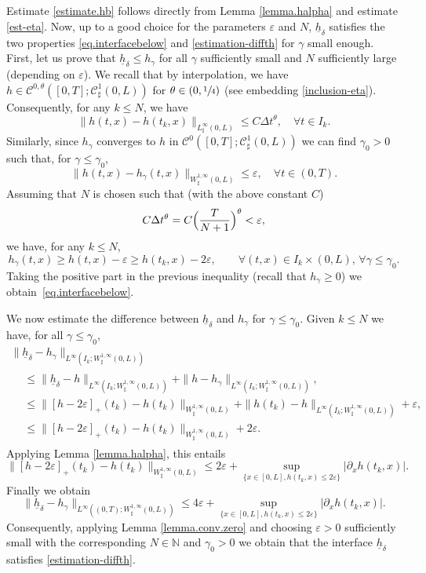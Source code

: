 \documentclass[10pt]{amsart}
\let\mathcal\mathscr
\theoremstyle{remark}
\theoremstyle{definition}
\newcommand{\Natural}{\mathbb{N}}
\newcommand{\hb}{{\underline{h}}}
\begin{document}
Estimate \eqref{estimate.hb} follows directly from Lemma \ref{lemma.halpha} and estimate \eqref{est-eta}.
Now, up to a good choice for the parameters $\varepsilon$ and $N$, $\hb_{\delta}$ satisfies the two
properties \eqref{eq.interfacebelow} and \eqref{estimation-diffth} for $\gamma$ small enough. First, let us prove that $\hb_{\delta}\leq h_{\gamma}$ for all $\gamma$ sufficiently small and $N$ sufficiently large (depending on $\varepsilon$). We recall that by interpolation, we have $h \in \mathcal{C}^{0,\theta}([0,T];\mathcal{C}^{1}_{\sharp}(0,L))$ for $\theta\in(0,\sfrac{1}{4})$ (see embedding \eqref{inclusion-eta}). Consequently, for any $k \leq N$, we have
\[
\|h(t,x) - h(t_{k},x)\|_{L^{\infty}_{\sharp}(0,L)} \leq C \Delta t^{\theta}, \quad \forall t \in I_k.
\]
Similarly, since $h_{\gamma}$ converges to $h$ in $\mathcal{C}^{0}([0,T];\mathcal{C}_\sharp^{1}(0,L))$ we can find $\gamma_0 >0$ such that, for $\gamma \leq \gamma_0$,
\[
\|h(t,x) - h_{\gamma}(t,x)\|_{W^{1,\infty}_{\sharp}(0,L)} \leq \varepsilon, \quad \forall t \in (0,T).
\]
Assuming that $N$ is chosen such that (with the above constant $C$)
\[
C \Delta t^{\theta}=C \Bigl(\dfrac T{N+1} \Bigr)^{\theta} < \varepsilon,
\]
we have, for any $k \leq N$,
\[
h_{\gamma}(t,x)\geq h(t,x)-\varepsilon\geq h(t_{k},x)-2\varepsilon, \qquad \forall(t,x)\in I_{k}\times(0,L),\,\forall \gamma\leq \gamma_{0}.
\]
Taking the positive part in the previous inequality (recall that $h_{\gamma}\!\geq\!0$) we obtain~\eqref{eq.interfacebelow}.

We now estimate the difference between $\hb_{\delta}$ and $h_{\gamma}$ for $\gamma \leq \gamma_0$.
Given $k \leq N$ we have, for all $\gamma \leq \gamma_0$,\vspace*{-3pt}
\begin{multline*}
\| \hb_{\delta}- h_\gamma\|_{L^\infty(I_k; W_\sharp^{1, \infty}(0, L))}\\
\begin{aligned}
&\leq \| \hb_{\delta}- h\|_{L^\infty(I_k; W_\sharp^{1, \infty}(0, L))}
+ \| h- h_\gamma\|_{L^\infty(I_k; W_\sharp^{1, \infty}(0, L))},\\
&\leq \| [h-2\varepsilon]_+(t_k)- h(t_k)\|_{W_\sharp^{1, \infty}(0, L)}
+\| h({t_k})- h\|_{L^\infty(I_k; W_\sharp^{1, \infty}(0, L))}
+ \varepsilon,\\
&\leq \| [h-2\varepsilon]_+(t_k)- h(t_k)\|_{W_\sharp^{1, \infty}(0, L)}
+2\varepsilon.
\end{aligned}
\end{multline*}
Applying Lemma \ref{lemma.halpha}, this entails
\[
\| [h-2\varepsilon]_+(t_k)- h(t_k)\|_{W_\sharp^{1, \infty}(0, L)}\leq 2\varepsilon +\sup_{\{x\in [0, L], h(t_k,x)\leq 2\varepsilon\}}\vert\partial_x h(t_k,x)\vert.
\]
Finally we obtain
\[
\| \hb_{\delta}- h_\gamma\|_{L^\infty((0,T); W_\sharp^{1, \infty}(0, L))}\leq 4 \varepsilon + \sup_{\{x\in [0, L], h(t_k, x)\leq 2\varepsilon\}}\vert\partial_x h(t_k,x )\vert. 
\]
Consequently, applying Lemma \ref{lemma.conv.zero} and choosing $\varepsilon>0$ sufficiently small with the corresponding $N \in\Natural$ and $\gamma_{0}>0$ we obtain that the interface $\hb_{\delta}$ satisfies \eqref{estimation-diffth}.
\end{document}
